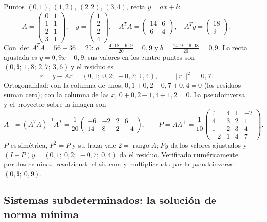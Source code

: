 \begin{ejemplo}\label{ej:recta-cuatro-puntos}
Puntos \((0,1)\), \((1,2)\), \((2,2)\), \((3,4)\), recta \(y=ax+b\):
\[
  A=\begin{pmatrix}0&1\\1&1\\2&1\\3&1\end{pmatrix},\quad
  y=\begin{pmatrix}1\\2\\2\\4\end{pmatrix},\quad
  A^TA=\begin{pmatrix}14&6\\6&4\end{pmatrix},\quad
  A^Ty=\begin{pmatrix}18\\9\end{pmatrix}.
\]
Con \(\det A^TA=56-36=20\): \(a=\tfrac{4\cdot18-6\cdot9}{20}=0{,}9\) y
\(b=\tfrac{14\cdot9-6\cdot18}{20}=0{,}9\). La recta ajustada es \(y=0{,}9x+0{,}9\); sus
valores en los cuatro puntos son \((0{,}9;\ 1{,}8;\ 2{,}7;\ 3{,}6)\) y el residuo es
\[
  r=y-A\hat x=(0{,}1;\ 0{,}2;\ -0{,}7;\ 0{,}4),\qquad \lVert r\rVert^2=0{,}7 .
\]
Ortogonalidad: con la columna de unos, \(0{,}1+0{,}2-0{,}7+0{,}4=0\) (los residuos suman
cero); con la columna de las \(x\), \(0+0{,}2-1{,}4+1{,}2=0\). La pseudoinversa y el
proyector sobre la imagen son
\[
  A^{+}=(A^TA)^{-1}A^T=\frac1{20}\begin{pmatrix}-6&-2&2&6\\14&8&2&-4\end{pmatrix},\qquad
  P=AA^{+}=\frac1{10}\begin{pmatrix}7&4&1&-2\\4&3&2&1\\1&2&3&4\\-2&1&4&7\end{pmatrix}.
\]
\setlength{\emergencystretch}{1em}%
\(P\) es simétrica, \(P^2=P\) y su traza vale \(2=\operatorname{rango}A\); \(Py\) da los
valores ajustados y \((I-P)y=(0{,}1;\ 0{,}2;\ -0{,}7;\ 0{,}4)\) da el residuo. Verificado
numéricamente por dos caminos, resolviendo el sistema y multiplicando por la pseudoinversa:
\((0{,}9;\ 0{,}9)\).
\end{ejemplo}

\subsection{Sistemas subdeterminados: la solución de norma mínima}\label{sec:norma-minima}

